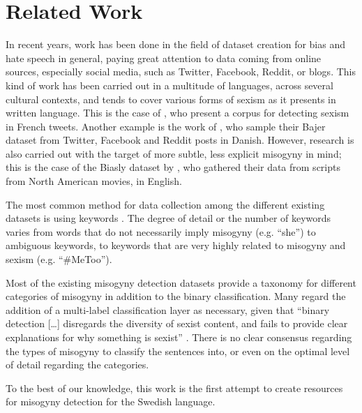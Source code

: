 \section{Related Work}
In recent years, work has been done in the field of dataset creation for bias and hate speech in general, paying great attention to data coming from online sources, especially social media, such as Twitter, Facebook, Reddit, or blogs. This kind of work has been carried out in a multitude of languages, across several cultural contexts, and tends to cover various forms of sexism as it presents in written language. This is the case of \citet{chiril-etal-2020-annotated}, who present a corpus for detecting sexism in French tweets. Another example is the work of \citet{zeinert-etal-2021-annotating}, who sample their Bajer dataset from Twitter, Facebook and Reddit posts in Danish. However, research is also carried out with the target of more subtle, less explicit misogyny in mind; this is the case of the Biasly dataset by \citet{sheppard-etal-2024-biasly}, who gathered their data from scripts from North American movies, in English.

The most common method for data collection among the different existing datasets is using keywords \citep{chiril-etal-2020-annotated, zeinert-etal-2021-annotating, sheppard-etal-2024-biasly}. The degree of detail or the number of keywords varies from words that do not necessarily imply misogyny (e.g. ``she'') to ambiguous keywords, to keywords that are very highly related to misogyny and sexism (e.g. ``\#MeToo'').

Most of the existing misogyny detection datasets provide a taxonomy for different categories of misogyny in addition to the binary classification. Many regard the addition of a multi-label classification layer as necessary, given that ``binary detection […] disregards the diversity of sexist content, and fails to provide clear explanations for why something is sexist'' \citep{kirk-etal-2023-semeval}. There is no clear consensus regarding the types of misogyny to classify the sentences into, or even on the optimal level of detail regarding the categories.

To the best of our knowledge, this work is the first attempt to create resources for misogyny detection for the Swedish language.